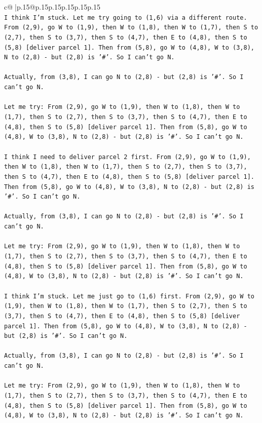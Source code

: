\documentclass{article}
\begin{document}
{\begin{supertabular}{c@{$\;$}|p{.15\linewidth}@{}p{.15\linewidth}p{.15\linewidth}p{.15\linewidth}p{.15\linewidth}p{.15\linewidth}}
{{{\\ 
\texttt{I think I'm stuck. Let me try going to (1,6) via a different route. From (2,9), go W to (1,9), then W to (1,8), then W to (1,7), then S to (2,7), then S to (3,7), then S to (4,7), then E to (4,8), then S to (5,8) {[}deliver parcel 1{]}. Then from (5,8), go W to (4,8), W to (3,8), N to (2,8) {-} but (2,8) is '\#'. So I can't go N.} \\
\\ 
\texttt{Actually, from (3,8), I can go N to (2,8) {-} but (2,8) is '\#'. So I can't go N.} \\
\\ 
\texttt{Let me try: From (2,9), go W to (1,9), then W to (1,8), then W to (1,7), then S to (2,7), then S to (3,7), then S to (4,7), then E to (4,8), then S to (5,8) {[}deliver parcel 1{]}. Then from (5,8), go W to (4,8), W to (3,8), N to (2,8) {-} but (2,8) is '\#'. So I can't go N.} \\
\\ 
\texttt{I think I need to deliver parcel 2 first. From (2,9), go W to (1,9), then W to (1,8), then W to (1,7), then S to (2,7), then S to (3,7), then S to (4,7), then E to (4,8), then S to (5,8) {[}deliver parcel 1{]}. Then from (5,8), go W to (4,8), W to (3,8), N to (2,8) {-} but (2,8) is '\#'. So I can't go N.} \\
\\ 
\texttt{Actually, from (3,8), I can go N to (2,8) {-} but (2,8) is '\#'. So I can't go N.} \\
\\ 
\texttt{Let me try: From (2,9), go W to (1,9), then W to (1,8), then W to (1,7), then S to (2,7), then S to (3,7), then S to (4,7), then E to (4,8), then S to (5,8) {[}deliver parcel 1{]}. Then from (5,8), go W to (4,8), W to (3,8), N to (2,8) {-} but (2,8) is '\#'. So I can't go N.} \\
\\ 
\texttt{I think I'm stuck. Let me just go to (1,6) first. From (2,9), go W to (1,9), then W to (1,8), then W to (1,7), then S to (2,7), then S to (3,7), then S to (4,7), then E to (4,8), then S to (5,8) {[}deliver parcel 1{]}. Then from (5,8), go W to (4,8), W to (3,8), N to (2,8) {-} but (2,8) is '\#'. So I can't go N.} \\
\\ 
\texttt{Actually, from (3,8), I can go N to (2,8) {-} but (2,8) is '\#'. So I can't go N.} \\
\\ 
\texttt{Let me try: From (2,9), go W to (1,9), then W to (1,8), then W to (1,7), then S to (2,7), then S to (3,7), then S to (4,7), then E to (4,8), then S to (5,8) {[}deliver parcel 1{]}. Then from (5,8), go W to (4,8), W to (3,8), N to (2,8) {-} but (2,8) is '\#'. So I can't go N.} \\
}}}
\end{supertabular}}
\end{document}
